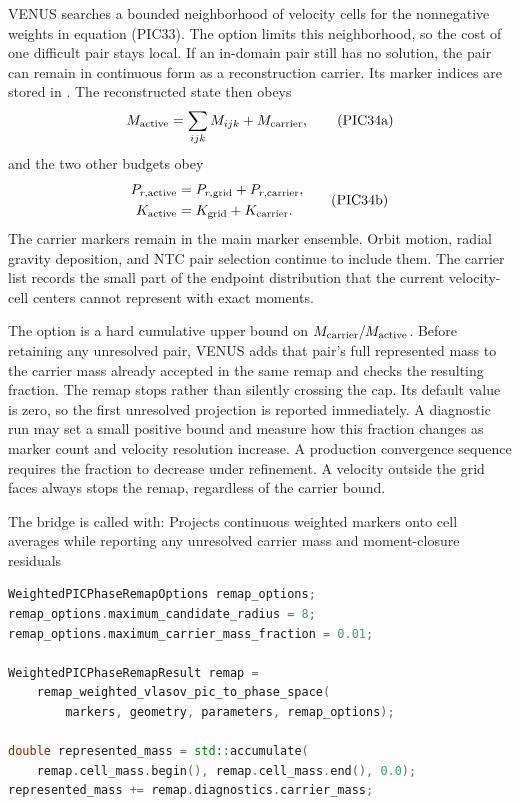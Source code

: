 VENUS searches a bounded neighborhood of velocity cells for the nonnegative
weights in equation (PIC33).  The option
 limits this neighborhood, so the cost of one
difficult pair stays local.  If an in-domain pair still has no solution, the
pair can remain in continuous form as a reconstruction carrier.  Its marker
indices are stored in .  The reconstructed state
then obeys
\[
 M_{\rm active}=\sum_{ijk}M_{ijk}+M_{\rm carrier},       \tag{PIC34a}
\]
and the two other budgets obey
\[
 \begin{aligned}
 P_{r,\rm active}&=P_{r,\rm grid}+P_{r,\rm carrier},\\
 K_{\rm active}&=K_{\rm grid}+K_{\rm carrier}.
 \end{aligned}                                          \tag{PIC34b}
\]
The carrier markers remain in the main marker ensemble.  Orbit motion,
radial gravity deposition, and NTC pair selection continue to include them.
The carrier list records the small part of the endpoint distribution that the
current velocity-cell centers cannot represent with exact moments.

The option  is a hard cumulative upper
bound on \(M_{\rm carrier}/M_{\rm active}\).  Before retaining any unresolved
pair, VENUS adds that pair's full represented mass to the carrier mass already
accepted in the same remap and checks the resulting fraction.  The remap stops
rather than silently crossing the cap.  Its default value is zero, so the
first unresolved projection is reported immediately.  A diagnostic run may
set a small positive bound and measure how this fraction changes as marker
count and velocity resolution increase.  A production convergence sequence
requires the fraction to decrease under refinement.  A velocity outside the
grid faces always stops the remap, regardless of the carrier bound.

The bridge is called with:
{}
{Projects continuous weighted markers onto cell averages while reporting any
 unresolved carrier mass and moment-closure residuals}
\begin{lstlisting}[language=C++]
WeightedPICPhaseRemapOptions remap_options;
remap_options.maximum_candidate_radius = 8;
remap_options.maximum_carrier_mass_fraction = 0.01;

WeightedPICPhaseRemapResult remap =
    remap_weighted_vlasov_pic_to_phase_space(
        markers, geometry, parameters, remap_options);

double represented_mass = std::accumulate(
    remap.cell_mass.begin(), remap.cell_mass.end(), 0.0);
represented_mass += remap.diagnostics.carrier_mass;
\end{lstlisting}

